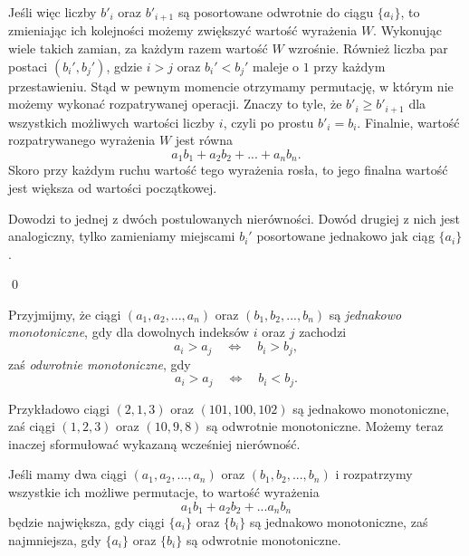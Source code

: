 \vspace{10px}

\noindent
Jeśli więc liczby $b'_i$ oraz $b'_{i + 1}$ są posortowane odwrotnie do ciągu $\{a_i\}$, to zmieniając ich kolejności możemy zwiększyć wartość wyrażenia $W$.
Wykonując wiele takich zamian, za każdym razem wartość $W$ wzrośnie. Również liczba par postaci $(b_i', b_j')$, gdzie $i > j$ oraz $b_i' < b_j'$ maleje o $1$ przy każdym przestawieniu. Stąd w pewnym momencie otrzymamy permutację, w którym nie możemy wykonać rozpatrywanej operacji. Znaczy to tyle, że $b'_i \geqslant b'_{i + 1}$ dla wszystkich możliwych wartości liczby $i$, czyli po prostu $b'_i = b_i$. Finalnie, wartość rozpatrywanego wyrażenia $W$ jest równa
\[
	a_1b_1 + a_2b_2 + ... + a_nb_n.
\]
Skoro przy każdym ruchu wartość tego wyrażenia rosła, to jego finalna wartość jest większa od wartości początkowej.

\vspace{10px}

\noindent
Dowodzi to jednej z dwóch postulowanych nierówności. Dowód drugiej z nich jest analogiczny, tylko zamieniamy miejscami $b_i'$ posortowane jednakowo jak ciąg $\{a_i\}$.

\qed

\vspace{10px}

\noindent
Przyjmijmy, że ciągi $(a_1, a_2, ..., a_n)$ oraz $(b_1, b_2, ..., b_n)$ są \textit{jednakowo monotoniczne}, gdy dla dowolnych indeksów $i$ oraz $j$ zachodzi
\[
	a_i > a_j \quad \iff \quad b_i > b_j,
\]
zaś \textit{odwrotnie monotoniczne}, gdy
\[
	a_i > a_j \quad \iff \quad b_i < b_j.
\]

\vspace{10px}

\noindent
Przykładowo ciągi $(2, 1, 3)$ oraz $(101, 100, 102)$ są jednakowo monotoniczne, zaś ciągi $(1, 2, 3)$ oraz $(10, 9, 8)$ są odwrotnie monotoniczne. Możemy teraz inaczej sformułować wykazaną wcześniej nierówność.

\vspace{10px}

\noindent
Jeśli mamy dwa ciągi $(a_1, a_2, ..., a_n)$ oraz $(b_1, b_2, ..., b_n)$ i rozpatrzymy wszystkie ich możliwe permutacje, to wartość wyrażenia
\[
	a_1b_1 + a_2b_2 + ... a_nb_n
\]
będzie największa, gdy ciągi $\{a_i\}$ oraz $\{b_i\}$ są jednakowo monotoniczne, zaś najmniejsza, gdy $\{a_i\}$ oraz $\{b_i\}$ są odwrotnie monotoniczne.

\vspace{10px}


